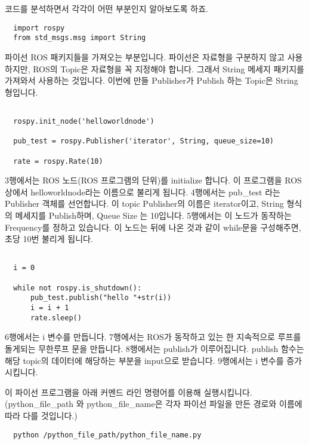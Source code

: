 \documentclass[11pt,fleqn]{book} %
\begin{document}
코드를 분석하면서 각각이 어떤 부분인지 알아보도록 하죠.

\begin{verbatim}
  import rospy
  from std_msgs.msg import String

\end{verbatim}

파이선 ROS 패키지들을 가져오는 부분입니다. 파이선은 자료형을 구분하지 않고 사용하지만, ROS의 Topic은 자료형을 꼭 지정해야 합니다.
그래서 String 메세지 패키지를 가져와서 사용하는 것입니다. 이번에 만들 Publisher가 Publish 하는 Topic은 String 형입니다.

\begin{verbatim}

  rospy.init_node('helloworldnode')

  pub_test = rospy.Publisher('iterator', String, queue_size=10)

  rate = rospy.Rate(10)
\end{verbatim}

3행에서는 ROS 노드(ROS 프로그램의 단위)를 initialize 합니다. 이 프로그램을 ROS 상에서 helloworldnode라는 이름으로 불리게 됩니다.
4행에서는 pub\_test 라는 Publisher 객체를 선언합니다. 이 topic Publisher의 이름은 iterator이고, String 형식의 메세지를 Publish하며, Queue Size 는 10입니다.
5행에서는 이 노드가 동작하는 Frequency를 정하고 있습니다. 이 노드는 뒤에 나온 것과 같이 while문을 구성해주면, 초당 10번 불리게 됩니다.

\begin{verbatim}

  i = 0

  while not rospy.is_shutdown():
      pub_test.publish("hello "+str(i))
      i = i + 1
      rate.sleep()
\end{verbatim}

6행에서는 i 변수를 만듭니다.
7행에서는 ROS가 동작하고 있는 한 지속적으로 루프를 돌게되는 무한루프 문을 만듭니다.
8행에서는 publish가 이루어집니다. publish 함수는 해당 topic의 데이터에 해당하는 부분을 input으로 받습니다.
9행에서는 i 변수를 증가시킵니다.

이 파이선 프로그램을 아래 커멘드 라인 명령어를 이용해 실행시킵니다. (python\_file\_path 와 python\_file\_name은 각자 파이선 파일을 만든 경로와 이름에 따라 다를 것입니다.)

\begin{verbatim}
  python /python_file_path/python_file_name.py
\end{verbatim}
\end{document}
